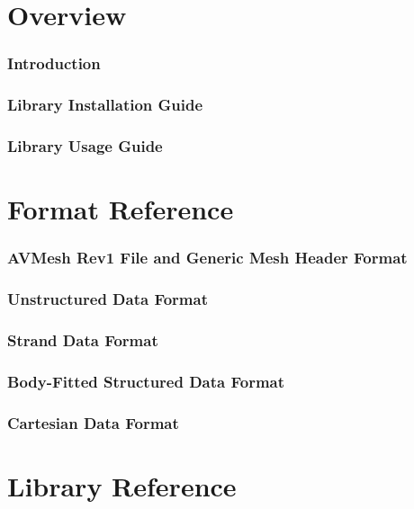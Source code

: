 \documentclass[a4paper]{article}
\begin{document}

\tableofcontents
\newpage
\part{Overview}
\section{Introduction}
\label{index}\hypertarget{index}{}
\newpage
\section{Library Installation Guide}
\label{install_guide}
\hypertarget{install_guide}{}

\newpage
\section{Library Usage Guide}
\label{quick_example}
\hypertarget{quick_example}{}

\newpage
\part{Format Reference}
\section{AVMesh Rev1 File and Generic Mesh Header Format}
\label{avmhdrs}
\hypertarget{avmhdrs_rev1}{}

\newpage
\section{Unstructured Data Format}
\label{unstruc}
\hypertarget{unstruc_rev1}{}

\newpage
\section{Strand Data Format}
\label{strand}
\hypertarget{strand_rev1}{}

\newpage
\section{Body-Fitted Structured Data Format}
\label{bfstruc}
\hypertarget{bfstruc_rev1}{}

\newpage
\section{Cartesian Data Format}
\label{cart}
\hypertarget{cart_rev1}{}

\newpage
\part{Library Reference}
\end{document}
